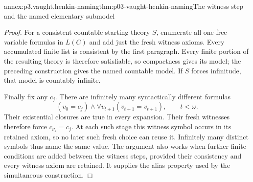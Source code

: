 \begin{annexitem}{annex:p3.vaught.henkin-naming}{thm:p03-vaught-henkin-naming}{The witness step and the named elementary submodel}
\begin{proof}
For a consistent countable starting theory \(S\), enumerate all
one-free-variable formulas in \(L(C)\) and add just the fresh witness
axioms. Every accumulated finite list is consistent by the first
paragraph. Every finite portion of the resulting theory is therefore
satisfiable, so compactness gives its model; the preceding construction
gives the named countable model. If \(S\) forces infinitude, that
model is countably infinite.

Finally fix any \(c_j\). There are infinitely many syntactically
different formulas
\[
 (v_0=c_j)\land\forall v_{t+1}(v_{t+1}=v_{t+1}),\qquad t<\omega.
\]
Their existential closures are true in every expansion.
Their fresh witnesses therefore force \(c_{\nu_s}=c_j\).
At each such stage this witness symbol occurs in its retained axiom,
so no later such fresh choice can reuse it. Infinitely many distinct
symbols thus name the same value. The argument also works when further
finite conditions are added between the witness steps, provided their
consistency and every witness axiom are retained. It supplies the alias
property used by the simultaneous construction.
\end{proof}
\end{annexitem}

